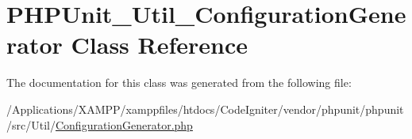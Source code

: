 \hypertarget{class_p_h_p_unit___util___configuration_generator}{}\section{P\+H\+P\+Unit\+\_\+\+Util\+\_\+\+Configuration\+Generator Class Reference}
\label{class_p_h_p_unit___util___configuration_generator}


The documentation for this class was generated from the following file\+:\begin{DoxyCompactItemize}
\item 
/\+Applications/\+X\+A\+M\+P\+P/xamppfiles/htdocs/\+Code\+Igniter/vendor/phpunit/phpunit/src/\+Util/\mbox{\hyperlink{_configuration_generator_8php}{Configuration\+Generator.\+php}}\end{DoxyCompactItemize}
